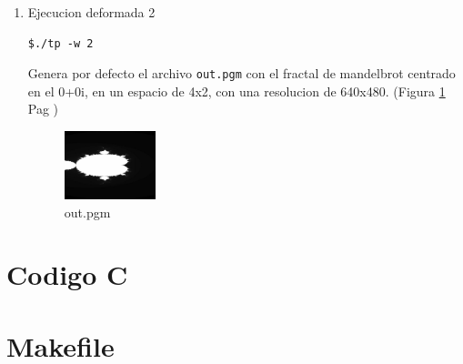 \documentclass[10pt,spanish,a4paper,openany,notitlepage]{article}
\newcommand{\captionlisting}[2][]{%
}
\begin{document}
\begin{enumerate}
\item Ejecucion deformada 2
\begin{framed}
\begin{verbatim}$./tp -w 2\end{verbatim}
\end{framed}

Genera por defecto el archivo \texttt{out.pgm} con el fractal de mandelbrot centrado en el 0+0i, en un espacio de 4x2, con una resolucion de 640x480. (Figura \ref{test6} Pag \pageref{test6})

\begin{figure}[hbt]
\centering
\includegraphics[width=0.25\textwidth]{out6.jpg}
\caption{out.pgm}
\label{test6}
\end{figure}

\end{enumerate}






\newpage
\appendix
\section{Codigo C}

\captionlisting{tp.c}

\newpage
\section{Makefile}



\newpage
\begin{thebibliography}{99} %


\end{thebibliography}
\end{document}
